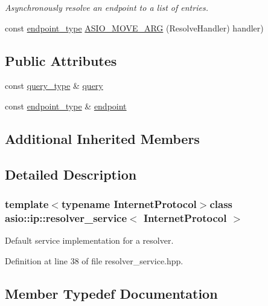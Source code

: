 \begin{DoxyCompactItemize}
\begin{DoxyCompactList}\small\item\em Asynchronously resolve an endpoint to a list of entries. \end{DoxyCompactList}\item 
const \hyperlink{classasio_1_1ip_1_1resolver__service_aa51d73a98d9f6a1df7ca69a419fa7bc3}{endpoint\+\_\+type} \hyperlink{classasio_1_1ip_1_1resolver__service_a7ba3865b619154601b6dd28e1ba336ed}{A\+S\+I\+O\+\_\+\+M\+O\+V\+E\+\_\+\+A\+R\+G} (Resolve\+Handler) handler)
\end{DoxyCompactItemize}
\subsection*{Public Attributes}
\begin{DoxyCompactItemize}
\item 
const \hyperlink{classasio_1_1ip_1_1resolver__service_a60008f0c960687605c978dff14011145}{query\+\_\+type} \& \hyperlink{classasio_1_1ip_1_1resolver__service_a150f786d8c12263e29e85662f4f8ed34}{query}
\item 
const \hyperlink{classasio_1_1ip_1_1resolver__service_aa51d73a98d9f6a1df7ca69a419fa7bc3}{endpoint\+\_\+type} \& \hyperlink{classasio_1_1ip_1_1resolver__service_a14162d17bcfa5a3e87b455caca632986}{endpoint}
\end{DoxyCompactItemize}
\subsection*{Additional Inherited Members}


\subsection{Detailed Description}
\subsubsection*{template$<$typename Internet\+Protocol$>$class asio\+::ip\+::resolver\+\_\+service$<$ Internet\+Protocol $>$}

Default service implementation for a resolver. 

Definition at line 38 of file resolver\+\_\+service.\+hpp.



\subsection{Member Typedef Documentation}
\hypertarget{classasio_1_1ip_1_1resolver__service_aa51d73a98d9f6a1df7ca69a419fa7bc3}{}
